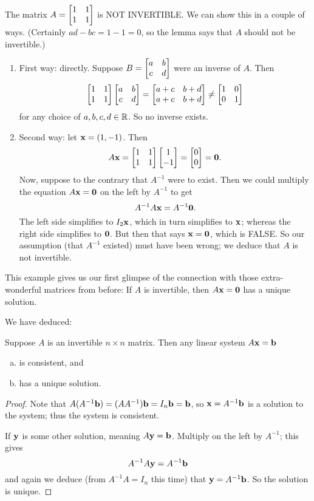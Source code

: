 \begin{myexample} The matrix $A = \left[ \begin{matrix} 1 & 1\\ 1 & 1 \end{matrix} \right]$ is NOT INVERTIBLE.  We
can show this in a  couple of ways.  (Certainly $ad-bc = 1-1=0$, so
the lemma says that $A$ should not be invertible.)
\begin{enumerate}
\item First way:  directly.  Suppose $B = \left[ \begin{matrix} a&b\\c&d \end{matrix} \right]$ were an
inverse of $A$.  Then
$$
\left[ \begin{matrix} 1 & 1\\ 1 & 1 \end{matrix} \right]\left[ \begin{matrix} a & b\\c&d \end{matrix} \right] = \left[ \begin{matrix} a+c & b+d \\ a+c & b+d \end{matrix} \right] \neq \left[ \begin{matrix} 1&0\\0&1 \end{matrix} \right]
$$
for any choice of $a,b,c,d\in\mathbb{R}$.  So no inverse exists.
\item Second way:  let $\mathbf{x} = (1,-1)$.  Then
$$
A\mathbf{x} = \left[ \begin{matrix} 1 & 1 \\ 1 & 1 \end{matrix} \right] \left[ \begin{matrix} 1\\-1 \end{matrix} \right] = \left[ \begin{matrix} 0\\0 \end{matrix} \right] = \mathbf{0}.
$$
Now, suppose to the contrary that $A^{-1}$ were to exist.  Then
we could multiply the equation $A\mathbf{x} = \mathbf{0}$ on the left
by $A^{-1}$ to get
$$
A^{-1} A \mathbf{x} = A^{-1} \mathbf{0}.
$$
The left side simplifies to $I_2 \mathbf{x}$, which in turn simplifies to $\mathbf{x}$;
 whereas the right side simplifies to $\mathbf{0}$.  But then that says $\mathbf{x}=\mathbf{0}$, which is FALSE.  So our assumption (that $A^{-1}$ existed) must have
been wrong; we deduce that $A$ is not invertible.
\end{enumerate}
 \end{myexample}

This example gives us our first glimpse of the connection with those extra-wonderful
matrices from before:  If $A$ is invertible, then $A \mathbf{x} = \mathbf{0}$ has a unique solution.


We have deduced:


\begin{lemma}
Suppose $A$ is an invertible $n\times n$ matrix.  Then any linear
system $A\mathbf{x} = \mathbf{b}$ 
\begin{enumerate}[(a)]
\item is consistent, and
\item has a unique solution.
\end{enumerate}
\end{lemma}

\begin{proof}
Note that $A(A^{-1}\mathbf{b}) = (AA^{-1})\mathbf{b} = I_n \mathbf{b} = \mathbf{b}$,
so $\mathbf{x} = A^{-1}\mathbf{b}$ is a solution to the system; thus the
system is consistent.

If $\mathbf{y}$ is some other solution, meaning $A \mathbf{y} = \mathbf{b}$.
Multiply on the left by $A^{-1}$; this gives
$$
A^{-1}A\mathbf{y} = A^{-1}\mathbf{b}
$$
and again we deduce (from $A^{-1}A = I_n$ this time) that $\mathbf{y} = A^{-1}\mathbf{b}$.  So the solution is unique.
\end{proof}

